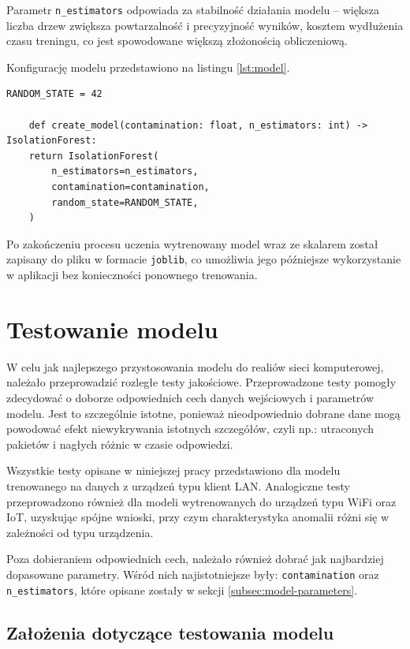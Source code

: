 Parametr \texttt{n\_estimators} odpowiada za stabilność działania modelu – większa liczba drzew zwiększa powtarzalność i precyzyjność wyników, kosztem wydłużenia czasu treningu, co jest spowodowane większą złożonością obliczeniową.

Konfigurację modelu przedstawiono na listingu \ref{lst:model}.

\begin{lstlisting}[style=pythonstyle, caption={Inicjalizacja modelu Isolation Forest}, label={lst:model}]
	RANDOM_STATE = 42
	
	def create_model(contamination: float, n_estimators: int) -> IsolationForest:
	return IsolationForest(
		n_estimators=n_estimators,
		contamination=contamination,
		random_state=RANDOM_STATE,
	)
\end{lstlisting}

Po zakończeniu procesu uczenia wytrenowany model wraz ze skalarem został zapisany do pliku w formacie \texttt{joblib}, co umożliwia jego późniejsze wykorzystanie w aplikacji bez konieczności ponownego trenowania.

\section{Testowanie modelu}

W celu jak najlepszego przystosowania modelu do realiów sieci komputerowej, należało przeprowadzić rozległe testy jakościowe. Przeprowadzone testy pomogły zdecydować o doborze odpowiednich cech danych wejściowych i parametrów modelu. Jest to szczególnie istotne, ponieważ nieodpowiednio dobrane dane mogą powodować efekt niewykrywania istotnych szczegółów, czyli np.: utraconych pakietów i nagłych różnic w czasie odpowiedzi.

Wszystkie testy opisane w niniejszej pracy przedstawiono dla modelu trenowanego na danych z urządzeń typu klient LAN. Analogiczne testy przeprowadzono również dla modeli wytrenowanych do urządzeń typu WiFi oraz IoT, uzyskując spójne wnioski, przy czym charakterystyka anomalii różni się w zależności od typu urządzenia.

Poza dobieraniem odpowiednich cech, należało również dobrać jak najbardziej dopasowane parametry. Wśród nich najistotniejsze były: \texttt{contamination} oraz \texttt{n\_estimators}, które opisane zostały w sekcji \ref{subsec:model-parameters}.

\subsection{Założenia dotyczące testowania modelu}

